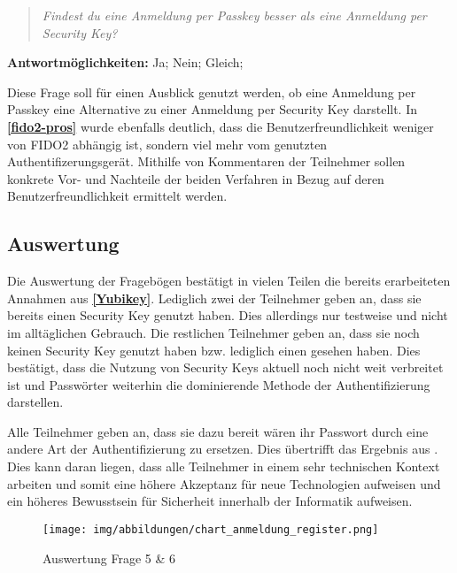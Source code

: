 \begin{quote}
    \textit{Findest du eine Anmeldung per Passkey besser als eine Anmeldung per Security Key?}
\end{quote}

\textbf{Antwortmöglichkeiten:} Ja; Nein; Gleich;

Diese Frage soll für einen Ausblick genutzt werden, ob eine Anmeldung per Passkey eine Alternative zu einer Anmeldung per Security Key darstellt. In \textbf{\ref{fido2-pros}} wurde ebenfalls deutlich, dass die Benutzerfreundlichkeit weniger von \ac{FIDO}2 abhängig ist, sondern viel mehr vom genutzten Authentifizerungsgerät.  Mithilfe von Kommentaren der Teilnehmer sollen konkrete Vor- und Nachteile der beiden Verfahren in Bezug auf deren Benutzerfreundlichkeit ermittelt werden.


\subsection{Auswertung}
Die Auswertung der Fragebögen bestätigt in vielen Teilen die bereits erarbeiteten Annahmen aus \textbf{\ref{Yubikey}}. Lediglich zwei der Teilnehmer geben an, dass sie bereits einen Security Key genutzt haben. Dies allerdings nur testweise und nicht im alltäglichen Gebrauch. Die restlichen Teilnehmer geben an, dass sie noch keinen Security Key genutzt haben bzw. lediglich einen gesehen haben. Dies bestätigt, dass die Nutzung von Security Keys aktuell noch nicht weit verbreitet ist und Passwörter weiterhin die dominierende Methode der Authentifizierung darstellen.

Alle Teilnehmer geben an, dass sie dazu bereit wären ihr Passwort durch eine andere Art der Authentifizierung zu ersetzen. Dies übertrifft das Ergebnis aus \cite{techstat}. Dies kann daran liegen, dass alle Teilnehmer in einem sehr technischen Kontext arbeiten und somit eine höhere Akzeptanz für neue Technologien aufweisen und ein höheres Bewusstsein für Sicherheit innerhalb der Informatik aufweisen. 

\begin{figure}[H]
	\centering 
	\texttt{[image: img/abbildungen/chart\_anmeldung\_register.png]}
	\captionsetup{format=hang}
	\caption{Auswertung Frage 5 \& 6}
\end{figure}

